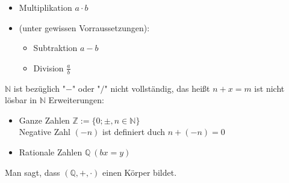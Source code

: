 \documentclass[11pt]{article}
\begin{document}
\begin{enumerate}
\begin{itemize}
\item Multiplikation $a\cdot b$
\item (unter gewissen Vorraussetzungen):
\begin{itemize}
\item Subtraktion $a-b$
\item Division $\frac{a}{b}$
\end{itemize}
\end{itemize}
$\mathbb{N}$ ist bezüglich "$-$" oder "$/$" nicht vollständig, das heißt $n+x = m$ ist nicht lösbar in $\mathbb{N}$
Erweiterungen:
\begin{itemize}
\item Ganze Zahlen $\mathbb{Z}:=\{0; \pm, n\in\mathbb{N}\}$ \\
       Negative Zahl $(-n)$ ist definiert duch $n+(-n) = 0$
\item Rationale Zahlen $\mathbb{Q}~(b x = y)$
\end{itemize}
Man sagt, dass $(\mathbb{Q},+,\cdot)$ einen Körper bildet.
\end{enumerate}
\end{document}
